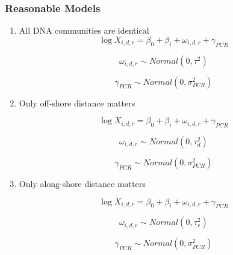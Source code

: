 \documentclass[12pt]{article}
\begin{document}
\subsubsection*{Reasonable Models}

\begin{enumerate}

	\item All DNA communities are identical
		\begin{equation}
		\log X_{i,d,r} = \beta_0 + \beta_i + \omega_{i,d,r} + \gamma_{PCR}
		\end{equation}

		\begin{equation}
		\omega_{i,d,r} \sim Normal(0,\tau^2)
		\end{equation}

		\begin{equation}
		\gamma_{PCR} \sim Normal(0,\sigma^2_{PCR})
		\end{equation}

\newpage
	\item Only off-shore distance matters

		\begin{equation}
		\log X_{i,d,r} = \beta_0 + \beta_i + \omega_{i,d,r} + \gamma_{PCR}
		\end{equation}

		\begin{equation}
		\omega_{i,d,r} \sim Normal(0,\tau_d^2)
		\end{equation}

		\begin{equation}
		\gamma_{PCR} \sim Normal(0,\sigma^2_{PCR})
		\end{equation}

	\item Only along-shore distance matters

		\begin{equation}
		\log X_{i,d,r} = \beta_0 + \beta_i + \omega_{i,d,r} + \gamma_{PCR}
		\end{equation}

		\begin{equation}
		\omega_{i,d,r} \sim Normal(0,\tau_r^2)
		\end{equation}

		\begin{equation}
		\gamma_{PCR} \sim Normal(0,\sigma^2_{PCR})
		\end{equation}


\end{enumerate}
\end{document}
